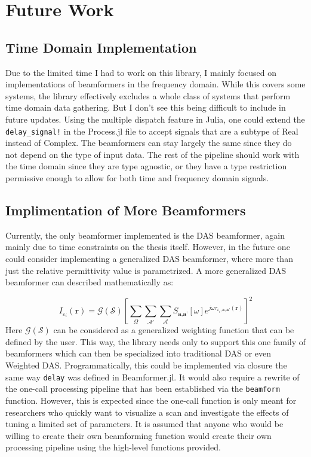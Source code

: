 \setcounter{chapter}{5}
\setcounter{section}{0}
\setcounter{subsection}{0}
\chapter*{Future Work}
\section{Time Domain Implementation}
\label{TDImplementation}
Due to the limited time I had to work on this library, I mainly focused on implementations of beamformers in the
frequency domain. While this covers some systems, the library effectively excludes a whole class of systems that perform
time domain data gathering. But I don't see this being difficult to include in future updates. Using the multiple
dispatch feature in Julia, one could extend the \lstinline[language=Julia]{delay_signal!} in the Process.jl file to
accept signals that are a subtype of Real instead of Complex. The beamformers can stay largely the same since they do
not depend on the type of input data. The rest of the pipeline should work with the time domain since they are type
agnostic, or they have a type restriction permissive enough to allow for both time and frequency domain signals.

\section{Implimentation of More Beamformers}
Currently, the only beamformer implemented is the DAS beamformer, again mainly due to time constraints on the thesis
itself. However, in the future one could consider implementing a generalized DAS beamformer, where more than just the
relative permittivity value is parametrized. A more generalized DAS beamformer can described mathematically as:

\begingroup
\large
\begin{equation}
    I_{\varepsilon_i}(\textbf{r}) = \mathcal{G}(\mathcal{S}) \left [\sum_{\Omega}\sum_{\mathcal{A}'}\sum_{\mathcal{A}} S_{\textbf{a}, \textbf{a'}}[\omega]e^{j\omega \tau_{\varepsilon_i, \textbf{a}, \textbf{a'}}(\textbf{r})}\right ]^2
    \label{eq:GeneralisedDASBeamformer}
\end{equation}
\endgroup
Here $\mathcal{G}(\mathcal{S})$ can be considered as a generalized weighting function that can be defined by the user. This way, the
library needs only to support this one family of beamformers which can then be specialized into traditional DAS or even
Weighted DAS. Programmatically, this could be implemented via closure the same way \lstinline[language=Julia]{delay} was
defined in Beamformer.jl. It would also require a rewrite of the one-call processing pipeline that has been established
via the \lstinline[language=Julia]{beamform} function. However, this is expected since the one-call function is only
meant for researchers who quickly want to visualize a scan and investigate the effects of tuning a limited set of
parameters. It is assumed that anyone who would be willing to create their own beamforming function would create their
own processing pipeline using the high-level functions provided. 


